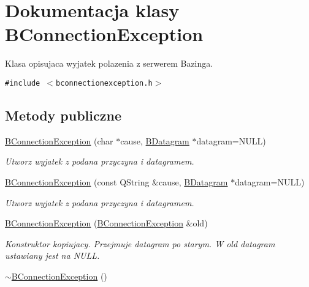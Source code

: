 \hypertarget{class_b_connection_exception}{
\section{Dokumentacja klasy BConnectionException}
\label{class_b_connection_exception}
}
Klasa opisujaca wyjatek polazenia z serwerem Bazinga.  


{\tt \#include $<$bconnectionexception.h$>$}

\subsection*{Metody publiczne}
\begin{CompactItemize}
\item 
\hypertarget{class_b_connection_exception_8434b332707e6b981af493ac142ddc34}{
\hyperlink{class_b_connection_exception_8434b332707e6b981af493ac142ddc34}{BConnectionException} (char $\ast$cause, \hyperlink{class_b_datagram}{BDatagram} $\ast$datagram=NULL)}
\label{class_b_connection_exception_8434b332707e6b981af493ac142ddc34}

\begin{CompactList}\small\item\em Utworz wyjatek z podana przyczyna i datagramem. \item\end{CompactList}\item 
\hypertarget{class_b_connection_exception_e805b541430e9a3e2af7750a4385ca64}{
\hyperlink{class_b_connection_exception_e805b541430e9a3e2af7750a4385ca64}{BConnectionException} (const QString \&cause, \hyperlink{class_b_datagram}{BDatagram} $\ast$datagram=NULL)}
\label{class_b_connection_exception_e805b541430e9a3e2af7750a4385ca64}

\begin{CompactList}\small\item\em Utworz wyjatek z podana przyczyna i datagramem. \item\end{CompactList}\item 
\hypertarget{class_b_connection_exception_a28e0f3ae8e5dc4a2154f106a289e470}{
\hyperlink{class_b_connection_exception_a28e0f3ae8e5dc4a2154f106a289e470}{BConnectionException} (\hyperlink{class_b_connection_exception}{BConnectionException} \&old)}
\label{class_b_connection_exception_a28e0f3ae8e5dc4a2154f106a289e470}

\begin{CompactList}\small\item\em Konstruktor kopiujacy. Przejmuje datagram po starym. W old datagram ustawiany jest na NULL. \item\end{CompactList}\item 
\hypertarget{class_b_connection_exception_ba3b955d554c45bbd279bd75e65e74f5}{
\hyperlink{class_b_connection_exception_ba3b955d554c45bbd279bd75e65e74f5}{$\sim$BConnectionException} ()}
\label{class_b_connection_exception_ba3b955d554c45bbd279bd75e65e74f5}


\end{CompactItemize}
